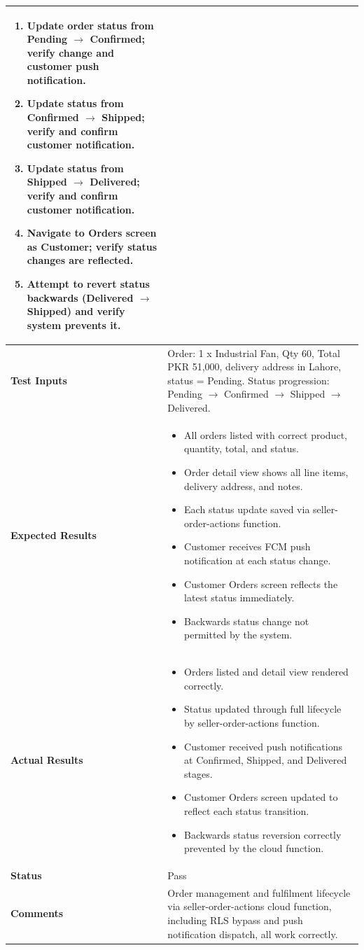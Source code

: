 {\begin{longtable}{|p{3.2cm}|p{10.8cm}|}
\begin{enumerate}[leftmargin=*,noitemsep]
\item Update order status from Pending $\rightarrow$ Confirmed; verify change and customer push notification.
\item Update status from Confirmed $\rightarrow$ Shipped; verify and confirm customer notification.
\item Update status from Shipped $\rightarrow$ Delivered; verify and confirm customer notification.
\item Navigate to Orders screen as Customer; verify status changes are reflected.
\item Attempt to revert status backwards (Delivered $\rightarrow$ Shipped) and verify system prevents it.
\end{enumerate} \\ \hline
\textbf{Test Inputs} & Order: 1 x Industrial Fan, Qty 60, Total PKR 51,000, delivery address in Lahore, status = Pending. Status progression: Pending $\rightarrow$ Confirmed $\rightarrow$ Shipped $\rightarrow$ Delivered. \\ \hline
\textbf{Expected Results} &
\begin{itemize}[leftmargin=*,noitemsep]
\item All orders listed with correct product, quantity, total, and status.
\item Order detail view shows all line items, delivery address, and notes.
\item Each status update saved via seller-order-actions function.
\item Customer receives FCM push notification at each status change.
\item Customer Orders screen reflects the latest status immediately.
\item Backwards status change not permitted by the system.
\end{itemize} \\ \hline
\textbf{Actual Results} &
\begin{itemize}[leftmargin=*,noitemsep]
\item Orders listed and detail view rendered correctly.
\item Status updated through full lifecycle by seller-order-actions function.
\item Customer received push notifications at Confirmed, Shipped, and Delivered stages.
\item Customer Orders screen updated to reflect each status transition.
\item Backwards status reversion correctly prevented by the cloud function.
\end{itemize} \\ \hline
\textbf{Status} & Pass \\ \hline
\textbf{Comments} & Order management and fulfilment lifecycle via seller-order-actions cloud function, including RLS bypass and push notification dispatch, all work correctly. \\ \hline
\end{longtable}
}

